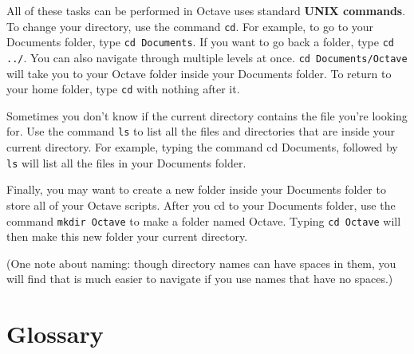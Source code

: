 All of these tasks can be performed in Octave uses standard {\bf UNIX commands}.
To change your directory, use the command {\tt cd}. For example, to go to your
Documents folder, type {\tt cd Documents}. If you want to go back a folder, type
{\tt cd ../}. You can also navigate through multiple levels at once. {\tt cd
Documents/Octave} will take you to your Octave folder inside your Documents
folder. To return to your home folder, type {\tt cd} with nothing after it.

Sometimes you don't know if the current directory contains the file you're
looking for. Use the command {\tt ls} to list all the files and directories that
are inside your current directory. For example, typing the command {cd
Documents}, followed by {\tt ls} will list all the files in your Documents
folder.

Finally, you may want to create a new folder inside your Documents folder to
store all of your Octave scripts. After you cd to your Documents folder, use
the command {\tt mkdir Octave} to make a folder named Octave. Typing {\tt cd
Octave} will then make this new folder your current directory.

(One note about naming: though directory names can have spaces in them, you
will find that is much easier to navigate if you use names that have
no spaces.)

\section{Glossary}

